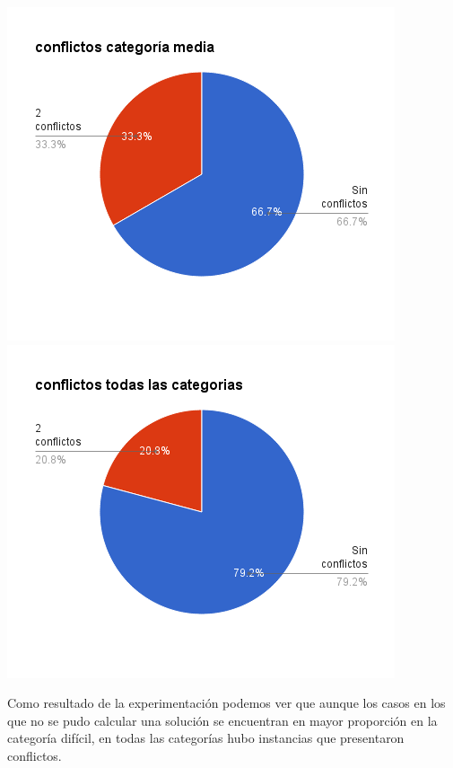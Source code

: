 \documentclass[a4paper,spanish]{article}
\begin{document}
\begin{minipage}{0.50\textwidth}
	\includegraphics[width=\textwidth]{./graficos/conflictosMedia.png}
	\includegraphics[width=\textwidth]{./graficos/conflictosTodas.png}
\end{minipage}

Como resultado de la experimentación podemos ver que aunque los casos en los que no se pudo
calcular una solución se encuentran en mayor proporción en la categoría difícil, en todas las
categorías hubo instancias que presentaron conflictos.
\end{document}
